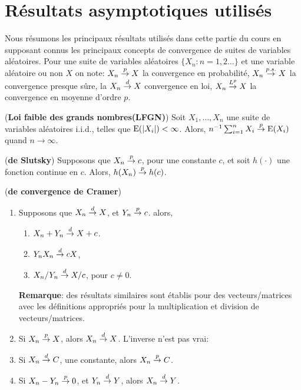 \newpage


\appendix

\section{Résultats asymptotiques utilisés}

Nous résumons les principaux résultats utilisés dans cette partie du cours en supposant connus les principaux concepts de 
convergence de suites de variables aléatoires. Pour une suite de variables aléatoires 
$\{X_n: n = 1, 2\ldots\}$ et une variable aléatoire ou non $X$ on note: $X_n\overset{p}{\rightarrow} X$ 
la convergence en probabilité, $X_n\overset{p.s.}{\rightarrow} X$ la convergence presque sûre, la $X_n\overset{d}{\rightarrow} X$
convergence en loi, $X_n\overset{L^p}{\rightarrow} X$ la convergence en moyenne d'ordre $p$.

\begin{theoreme}(\textbf{Loi faible des grands nombres(LFGN)})
    Soit $X_1, \ldots, X_n$ une suite de variables aléatoires i.i.d., telles que $\operatorname{E}(\left\vert {X_i} \right\vert) <\infty$. Alors, 
    $n^{-1}\sum_{i=1}^n X_i\overset{p}{\rightarrow} \operatorname{E}(X_i)$ quand $n\to\infty$.
\end{theoreme}

\begin{theoreme}(\textbf{de Slutsky})
Supposons que $X_n \overset{p}{\rightarrow} c$, pour une constante $c$, et soit $h(\cdot)$ une fonction continue en $c$. Alors, 
$h(X_n)\overset{p}{\rightarrow} h(c)$.
\end{theoreme}

\begin{theoreme}(\textbf{de convergence de Cramer})
    \begin{enumerate}[label = (\roman*)]
    \item Supposons que $X_n \overset{d}{\rightarrow} X$, et $Y_n \overset{p}{\rightarrow} c$. alors,
    \begin{enumerate}[label = (\alph*)]
        \item $X_n + Y_n \overset{d}{\rightarrow} X + c$.
        \item $Y_nX_n \overset{d}{\rightarrow} cX$,
        \item $X_n/Y_n \overset{d}{\rightarrow} X/c$, pour $c\neq 0$.
    \end{enumerate}
    \textbf{Remarque}: des résultats similaires sont établis pour des vecteurs/matrices avec 
les définitions appropriés pour la multiplication et division de vecteurs/matrices.
    \item  Si $X_n \overset{p}{\rightarrow} X$, alors $X_n \overset{d}{\rightarrow} X$. L'inverse n'est pas vrai:
    \item Si $X_n \overset{d}{\rightarrow} C$, une constante, alors $X_n \overset{p}{\rightarrow} C$.
    \item  Si $X_n - Y_n \overset{p}{\rightarrow} 0$, et $Y_n \overset{d}{\rightarrow} Y$, alors $X_n\overset{d}{\rightarrow} Y$.
    \end{enumerate}
\end{theoreme}
\newpage

